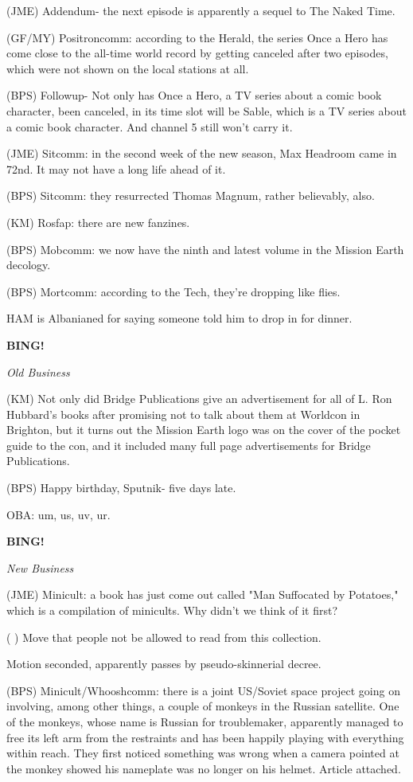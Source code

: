 \documentclass[12pt]{article}
\newcommand{\bing}{{\bf BING!} }
\newcommand{\goto}[1]{\bing \vskip 12pt \centerline{{\em{#1}}}}
\begin{document}
(JME) Addendum- the next episode is apparently a sequel to The Naked Time.

(GF/MY) Positroncomm: according to the Herald, the series Once a Hero has come close to the all-time world record by getting canceled after two episodes, which were not shown on the local stations at all.

(BPS) Followup- Not only has Once a Hero, a TV series about a comic book character, been canceled, in its time slot will be Sable, which is a TV series about a comic book character. And channel 5 still won't carry it.

(JME) Sitcomm: in the second week of the new season, Max Headroom came in 72nd. It may not have a long life ahead of it.

(BPS) Sitcomm: they resurrected Thomas Magnum, rather believably, also.

(KM) Rosfap: there are new fanzines.

(BPS) Mobcomm: we now have the ninth and latest volume in the Mission Earth decology.

(BPS) Mortcomm: according to the Tech, they're dropping like flies.

HAM is Albanianed for saying someone told him to drop in for dinner.

\goto{Old Business}

(KM) Not only did Bridge Publications give an advertisement for all of L. Ron Hubbard's books after promising not to talk about them at Worldcon in Brighton, but it turns out the Mission Earth logo was on the cover of the pocket guide to the con, and it included many full page advertisements for Bridge Publications.

(BPS) Happy birthday, Sputnik- five days late.

OBA: um, us, uv, ur.

\goto{New Business}

(JME) Minicult: a book has just come out called "Man Suffocated by Potatoes," which is a compilation of minicults. Why didn't we think of it first?

( ) Move that people not be allowed to read from this collection.

Motion seconded, apparently passes by pseudo-skinnerial decree.

(BPS) Minicult/Whooshcomm: there is a joint US/Soviet space project going on involving, among other things, a couple of monkeys in the Russian satellite. One of the monkeys, whose name is Russian for troublemaker, apparently managed to free its left arm from the restraints and has been happily playing with everything within reach. They first noticed something was wrong when a camera pointed at the monkey showed his nameplate was no longer on his helmet. Article attached.
\end{document}
